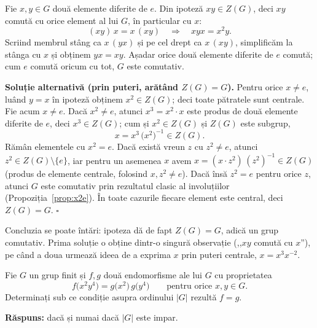 \begin{solutie}
Fie $x,y\in G$ două elemente diferite de $e$. Din ipoteză
$xy\in Z(G)$, deci $xy$ comută cu orice element al lui $G$, în
particular cu $x$:
\[
  (xy)\,x = x\,(xy) \quad\Longrightarrow\quad xyx = x^{2}y .
\]
Scriind membrul stâng ca $x\,(yx)$ și pe cel drept ca $x\,(xy)$,
simplificăm la stânga cu $x$ și obținem $yx = xy$. Așadar
orice două elemente diferite de $e$ comută; cum $e$ comută
oricum cu tot, $G$ este comutativ.
\end{solutie}

\medskip
\noindent\textbf{Soluție alternativă (prin puteri, arătând $Z(G)=G$).}\enspace
Pentru orice $x\neq e$, luând $y=x$ în ipoteză obținem
$x^{2}\in Z(G)$; deci toate pătratele sunt centrale. Fie acum $x\neq e$.
Dacă $x^{2}\neq e$, atunci $x^{3}=x^{2}\cdot x$ este produs de două
elemente diferite de $e$, deci $x^{3}\in Z(G)$; cum și $x^{2}\in Z(G)$
și $Z(G)$ este subgrup,
\[
  x = x^{3}\,\bigl(x^{2}\bigr)^{-1} \in Z(G).
\]
Rămân elementele cu $x^{2}=e$. Dacă există vreun $z$ cu
$z^{2}\neq e$, atunci $z^{2}\in Z(G)\setminus\{e\}$, iar pentru un asemenea
$x$ avem $x = (x\cdot z^{2})\,(z^{2})^{-1}\in Z(G)$ (produs de elemente
centrale, folosind $x, z^{2}\neq e$). Dacă însă $z^{2}=e$ pentru
orice $z$, atunci $G$ este comutativ prin rezultatul clasic al involuțiilor
(Propoziția~\ref{prop:x2e}). În toate cazurile fiecare element este central, deci
$Z(G)=G$. \hfill$\square$

\begin{obs}
Concluzia se poate întări: ipoteza dă de fapt $Z(G)=G$, adică
un grup comutativ. Prima soluție o obține dintr-o singură
observație (,,$xy$ comută cu $x$''), pe când a doua urmează
ideea de a exprima $x$ prin puteri centrale, $x=x^{3}x^{-2}$.
\end{obs}

\begin{problema}
Fie $G$ un grup finit și $f,g$ două endomorfisme ale lui $G$ cu
proprietatea
\[
  f\bigl(x^{2}y^{4}\bigr) = g\bigl(x^{2}\bigr)\,g\bigl(y^{4}\bigr)
  \qquad \text{pentru orice } x,y\in G.
\]
Determinați sub ce condiție asupra ordinului $|G|$ rezultă
$f=g$.
\end{problema}

\noindent\textbf{Răspuns:} dacă și numai dacă $|G|$ este
impar.

